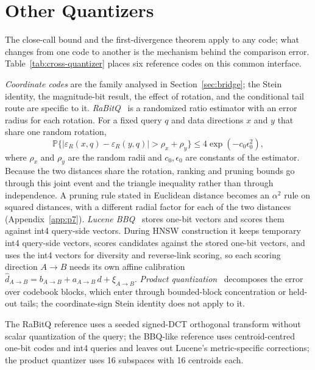 \documentclass[twoside,11pt]{article}
\newcommand{\Pp}{\mathbb{P}}
\begin{document}
\section{Other Quantizers}
\label{sec:instantiations}

The close-call bound and the first-divergence theorem apply to any code; what changes from one code to another is the mechanism behind the comparison error. Table~\ref{tab:cross-quantizer} places six reference codes on this common interface.

\emph{Coordinate codes} are the family analysed in Section~\ref{sec:bridge}; the Stein identity, the magnitude-bit result, the effect of rotation, and the conditional tail route are specific to it. \emph{RaBitQ}~\citep{gao2023rabitq} is a randomized ratio estimator with an error radius for each rotation. For a fixed query $q$ and data directions $x$ and $y$ that share one random rotation,
\begin{equation}
\Pp\{|\varepsilon_R(x,q)-\varepsilon_R(y,q)|>\rho_x+\rho_y\}\le4\exp(-c_0\epsilon_0^2),
\end{equation}
where $\rho_x$ and $\rho_y$ are the random radii and $c_0,\epsilon_0$ are constants of the estimator. Because the two distances share the rotation, ranking and pruning bounds go through this joint event and the triangle inequality rather than through independence. A pruning rule stated in Euclidean distance becomes an $\alpha^2$ rule on squared distances, with a different radial factor for each of the two distances (Appendix~\ref{app:p7}). \emph{Lucene BBQ}~\citep{trent2024bbq} stores one-bit vectors and scores them against int4 query-side vectors. During HNSW construction it keeps temporary int4 query-side vectors, scores candidates against the stored one-bit vectors, and uses the int4 vectors for diversity and reverse-link scoring, so each scoring direction $A\to B$ needs its own affine calibration $\widehat d_{A\to B}=b_{A\to B}+a_{A\to B}\,d+\xi_{A\to B}$. \emph{Product quantization}~\citep{jegou2011product,ge2014optimized} decomposes the error over codebook blocks, which enter through bounded-block concentration or held-out tails; the coordinate-sign Stein identity does not apply to it.

The RaBitQ reference uses a seeded signed-DCT orthogonal transform without scalar quantization of the query; the BBQ-like reference uses centroid-centred one-bit codes and int4 queries and leaves out Lucene's metric-specific corrections; the product quantizer uses 16 subspaces with 16 centroids each.
\end{document}
